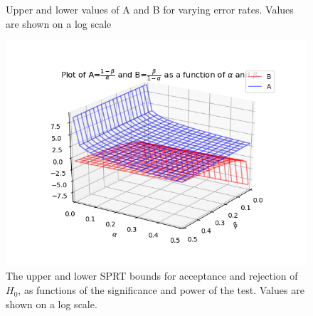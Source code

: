 \begin{figure}%
    \centering
    \qquad
    \caption{Upper and lower values of A and B for varying error rates. Values are shown on a log scale}%
    \label{fig:VaryingSPRTParameters}%
\end{figure}


\begin{figure}
    \centering
    \includegraphics[width = 0.75\linewidth]{Chapters/MultiAgentTargetDetection/Figs/SearchTermination/AandBAsFunctionOfAlphaAndBetaLogTransform.png}
    \caption{The upper and lower SPRT bounds for acceptance and rejection of $H_0$, as functions of the significance and power of the test. Values are shown on a log scale.}
    \label{fig:SPRTCutoffFunctionOfAlphaAndBeta}
\end{figure}


